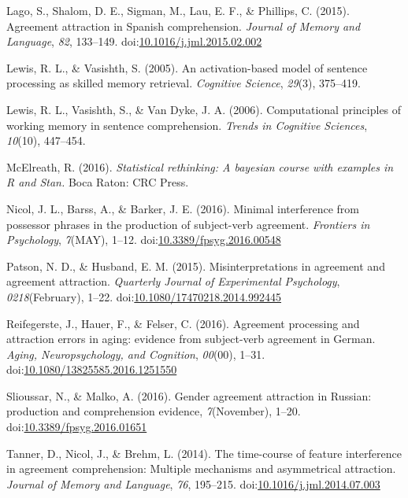 \documentclass[doc]{apa6}
\begin{document}
\leavevmode\hypertarget{ref-LagoEtAl:2015}{}%
Lago, S., Shalom, D. E., Sigman, M., Lau, E. F., \& Phillips, C. (2015). Agreement attraction in Spanish comprehension. \emph{Journal of Memory and Language}, \emph{82}, 133--149. doi:\href{https://doi.org/10.1016/j.jml.2015.02.002}{10.1016/j.jml.2015.02.002}

\leavevmode\hypertarget{ref-Lewis2005}{}%
Lewis, R. L., \& Vasishth, S. (2005). An activation-based model of sentence processing as skilled memory retrieval. \emph{Cognitive Science}, \emph{29}(3), 375--419.

\leavevmode\hypertarget{ref-Lewis2006}{}%
Lewis, R. L., Vasishth, S., \& Van Dyke, J. A. (2006). Computational principles of working memory in sentence comprehension. \emph{Trends in Cognitive Sciences}, \emph{10}(10), 447--454.

\leavevmode\hypertarget{ref-McElreath:2016}{}%
McElreath, R. (2016). \emph{Statistical rethinking: A bayesian course with examples in R and Stan.} Boca Raton: CRC Press.

\leavevmode\hypertarget{ref-NicolEtAl:2016}{}%
Nicol, J. L., Barss, A., \& Barker, J. E. (2016). Minimal interference from possessor phrases in the production of subject-verb agreement. \emph{Frontiers in Psychology}, \emph{7}(MAY), 1--12. doi:\href{https://doi.org/10.3389/fpsyg.2016.00548}{10.3389/fpsyg.2016.00548}

\leavevmode\hypertarget{ref-PatsonHusband:2015}{}%
Patson, N. D., \& Husband, E. M. (2015). Misinterpretations in agreement and agreement attraction. \emph{Quarterly Journal of Experimental Psychology}, \emph{0218}(February), 1--22. doi:\href{https://doi.org/10.1080/17470218.2014.992445}{10.1080/17470218.2014.992445}

\leavevmode\hypertarget{ref-ReifegersteEtAl:2016}{}%
Reifegerste, J., Hauer, F., \& Felser, C. (2016). Agreement processing and attraction errors in aging: evidence from subject-verb agreement in German. \emph{Aging, Neuropsychology, and Cognition}, \emph{00}(00), 1--31. doi:\href{https://doi.org/10.1080/13825585.2016.1251550}{10.1080/13825585.2016.1251550}

\leavevmode\hypertarget{ref-SlioussarMalko:2016}{}%
Slioussar, N., \& Malko, A. (2016). Gender agreement attraction in Russian: production and comprehension evidence, \emph{7}(November), 1--20. doi:\href{https://doi.org/10.3389/fpsyg.2016.01651}{10.3389/fpsyg.2016.01651}

\leavevmode\hypertarget{ref-TannerEtAl:2014}{}%
Tanner, D., Nicol, J., \& Brehm, L. (2014). The time-course of feature interference in agreement comprehension: Multiple mechanisms and asymmetrical attraction. \emph{Journal of Memory and Language}, \emph{76}, 195--215. doi:\href{https://doi.org/10.1016/j.jml.2014.07.003}{10.1016/j.jml.2014.07.003}
\end{document}
